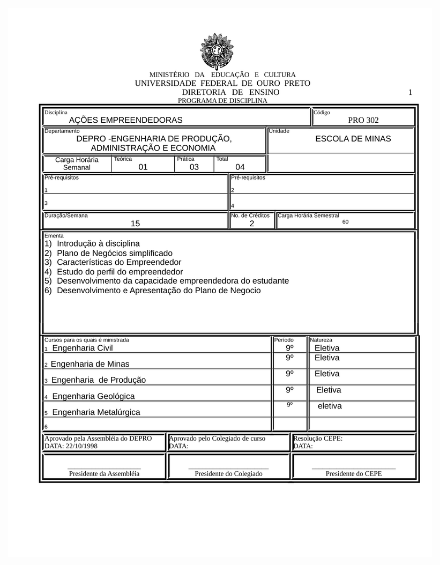 \begin{figure}[p]
	\centering 
	\includegraphics[scale=0.7]{capitulos/anexo1-programas-disciplina/eg320.pdf}
\end{figure}

